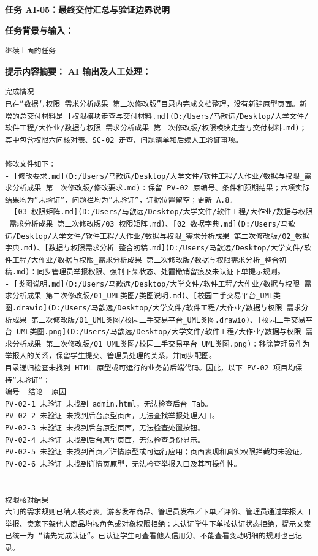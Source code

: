 \documentclass[heading=true,UTF8,a4paper,zihao=-4]{ctexart}
\begin{document}
\begin{QABox}
\textbf{任务 AI-05：最终交付汇总与验证边界说明}

\textbf{任务背景与输入：}
\begin{lstlisting}
继续上面的任务
\end{lstlisting}

\textbf{提示内容摘要：}
\textbf{AI 输出及人工处理：}
\begin{lstlisting}
完成情况
已在“数据与权限_需求分析成果 第二次修改版”目录内完成文档整理，没有新建原型页面。新增的总交付材料是 [权限模块走查与交付材料.md](D:/Users/马歆远/Desktop/大学文件/软件工程/大作业/数据与权限_需求分析成果 第二次修改版/权限模块走查与交付材料.md)；其中包含权限六问核对表、SC-02 走查、问题清单和后续人工验证事项。

修改文件如下：
- [修改要求.md](D:/Users/马歆远/Desktop/大学文件/软件工程/大作业/数据与权限_需求分析成果 第二次修改版/修改要求.md)：保留 PV-02 原编号、条件和预期结果；六项实际结果均为“未验证”，问题栏均为“未验证”，证据位置留空；更新 A.8。
- [03_权限矩阵.md](D:/Users/马歆远/Desktop/大学文件/软件工程/大作业/数据与权限_需求分析成果 第二次修改版/03_权限矩阵.md)、[02_数据字典.md](D:/Users/马歆远/Desktop/大学文件/软件工程/大作业/数据与权限_需求分析成果 第二次修改版/02_数据字典.md)、[数据与权限需求分析_整合初稿.md](D:/Users/马歆远/Desktop/大学文件/软件工程/大作业/数据与权限_需求分析成果 第二次修改版/数据与权限需求分析_整合初稿.md)：同步管理员举报权限、强制下架状态、处置撤销留痕及未认证下单提示规则。
- [类图说明.md](D:/Users/马歆远/Desktop/大学文件/软件工程/大作业/数据与权限_需求分析成果 第二次修改版/01_UML类图/类图说明.md)、[校园二手交易平台_UML类图.drawio](D:/Users/马歆远/Desktop/大学文件/软件工程/大作业/数据与权限_需求分析成果 第二次修改版/01_UML类图/校园二手交易平台_UML类图.drawio)、[校园二手交易平台_UML类图.png](D:/Users/马歆远/Desktop/大学文件/软件工程/大作业/数据与权限_需求分析成果 第二次修改版/01_UML类图/校园二手交易平台_UML类图.png)：移除管理员作为举报人的关系，保留学生提交、管理员处理的关系，并同步配图。
目录递归检查未找到 HTML 原型或可运行的业务前后端代码。因此，以下 PV-02 项目均保持“未验证”：
编号	结论	原因
PV-02-1	未验证	未找到 admin.html，无法检查后台 Tab。
PV-02-2	未验证	未找到后台原型页面，无法查找举报处理入口。
PV-02-3	未验证	未找到后台原型页面，无法检查处置按钮。
PV-02-4	未验证	未找到后台原型页面，无法检查身份显示。
PV-02-5	未验证	未找到首页／详情原型或可运行应用；页面表现和真实权限拦截均未验证。
PV-02-6	未验证	未找到详情页原型，无法检查举报入口及其可操作性。


权限核对结果
六问的需求规则已纳入核对表。游客发布商品、管理员发布／下单／评价、管理员通过举报入口举报、卖家下架他人商品均按角色或对象权限拒绝；未认证学生下单按认证状态拒绝，提示文案已统一为 “请先完成认证”。已认证学生可查看他人信用分、不能查看变动明细的规则也已记录。


\end{lstlisting}
\end{QABox}
\end{document}
